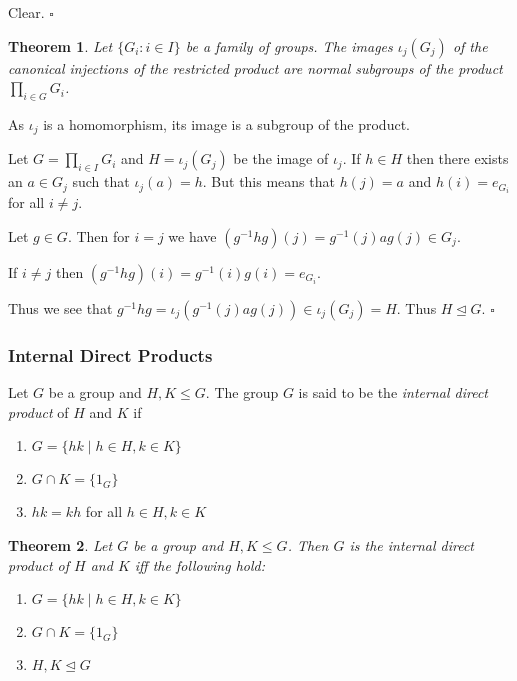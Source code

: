 \documentclass[10pt]{article}
\newtheorem{theorem}{Theorem}[section]
\newenvironment{proof}[1][Proof]{\begin{trivlist}
\item[\hskip \labelsep {\itshape #1}]}{\end{trivlist}}
\newenvironment{definition}[1][Definition]{\begin{trivlist}
\item[\hskip \labelsep {\bfseries #1}]}{\end{trivlist}}
\begin{document}
\begin{proof}
Clear. $\square$
\end{proof}

\begin{theorem}
Let $\{G_i : i \in I\}$ be a family of groups. The images $\iota_j(G_j)$ of the canonical injections of the restricted product are normal subgroups of the product $\prod_{i\in G} G_i$.
\end{theorem}

\begin{proof}
As $\iota_j$ is a homomorphism, its image is a subgroup of the product.

Let $G = \prod_{i \in I} G_i$ and $H = \iota_j(G_j)$ be the image of $\iota_j$. If $h \in H$ then there exists an $a \in G_j$ such that $\iota_j(a) = h$. But this means that $h(j) = a$ and $h(i) = e_{G_i}$ for all $i \neq j$.

Let $g \in G$. Then for $i = j$ we have $(g^{-1}hg)(j) = g^{-1}(j)ag(j) \in G_j$.

If $i \neq j$ then $(g^{-1}hg)(i) = g^{-1}(i)g(i) = e_{G_i}$.

Thus we see that $g^{-1}hg = \iota_j(g^{-1}(j)ag(j)) \in \iota_j(G_j) = H$. Thus $H \mathrel{\unlhd} G$. $\square$
\end{proof}

\subsubsection{Internal Direct Products}

\begin{definition}
Let $G$ be a group and $H, K \leq G$. The group $G$ is said to be the \emph{internal direct product} of $H$ and $K$ if
\begin{enumerate}
\item $G = \{hk \;|\; h \in H, k \in K\}$
\item $G\cap K = \{1_G\}$
\item $hk = kh$ for all $h \in H, k \in K$
\end{enumerate}
\end{definition}

\begin{theorem}
Let $G$ be a group and $H, K \leq G$. Then $G$ is the internal direct product of $H$ and $K$ iff the following hold:
\begin{enumerate}
\item $G = \{hk \;|\; h \in H, k \in K\}$
\item $G\cap K = \{1_G\}$
\item $H, K \mathrel{\unlhd} G$
\end{enumerate}
\end{theorem}
\end{document}
